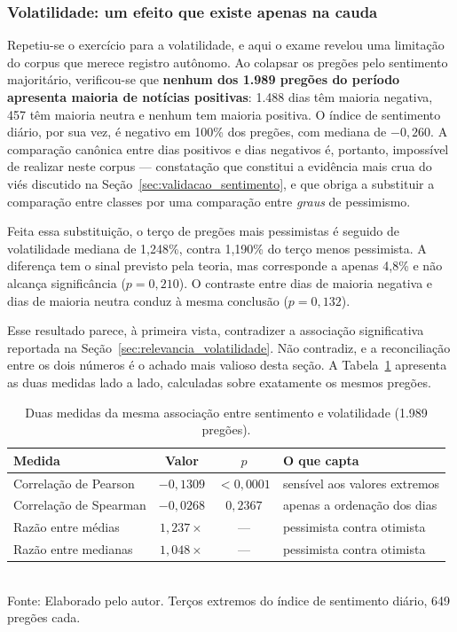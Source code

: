 \subsubsection{Volatilidade: um efeito que existe apenas na cauda}

Repetiu-se o exercício para a volatilidade, e aqui o exame revelou uma limitação do corpus que
merece registro autônomo. Ao colapsar os pregões pelo sentimento majoritário, verificou-se que
\textbf{nenhum dos 1.989 pregões do período apresenta maioria de notícias positivas}: 1.488 dias têm
maioria negativa, 457 têm maioria neutra e nenhum tem maioria positiva. O índice de sentimento diário,
por sua vez, é negativo em 100\% dos pregões, com mediana de $-0{,}260$. A comparação canônica entre
dias positivos e dias negativos é, portanto, impossível de realizar neste corpus --- constatação que
constitui a evidência mais crua do viés discutido na Seção~\ref{sec:validacao_sentimento}, e que
obriga a substituir a comparação entre classes por uma comparação entre \emph{graus} de pessimismo.

Feita essa substituição, o terço de pregões mais pessimistas é seguido de volatilidade mediana de
1,248\%, contra 1,190\% do terço menos pessimista. A diferença tem o sinal previsto pela teoria, mas
corresponde a apenas 4,8\% e não alcança significância ($p = 0{,}210$). O contraste entre dias de
maioria negativa e dias de maioria neutra conduz à mesma conclusão ($p = 0{,}132$).

Esse resultado parece, à primeira vista, contradizer a associação significativa reportada na
Seção~\ref{sec:relevancia_volatilidade}. Não contradiz, e a reconciliação entre os dois números é o
achado mais valioso desta seção. A Tabela~\ref{tab:auditoria_cauda} apresenta as duas medidas lado a
lado, calculadas sobre exatamente os mesmos pregões.

\begin{table}[htpb]
\centering
\caption{Duas medidas da mesma associação entre sentimento e volatilidade (1.989 pregões).}
\label{tab:auditoria_cauda}
\begin{tabular}{l c c l}
\hline
\textbf{Medida} & \textbf{Valor} & \textbf{$p$} & \textbf{O que capta} \\ \hline
Correlação de Pearson  & $-0{,}1309$ & $<0{,}0001$ & sensível aos valores extremos \\
Correlação de Spearman & $-0{,}0268$ & $0{,}2367$  & apenas a ordenação dos dias \\
Razão entre médias     & $1{,}237\times$ & --- & pessimista contra otimista \\
Razão entre medianas   & $1{,}048\times$ & --- & pessimista contra otimista \\
\hline
\end{tabular}
\vspace{0.2cm}
{\small \\ Fonte: Elaborado pelo autor. Terços extremos do índice de sentimento diário, 649 pregões cada.}
\end{table}

